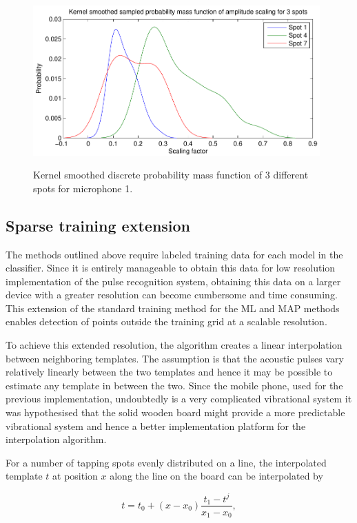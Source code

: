 \begin{figure}
\centering
  \includegraphics[width=110mm]{amplitudeProbMass.pdf}\\
  \caption{Kernel smoothed discrete probability mass function of 3 different spots for microphone 1.}\label{fig:amplitudeProbMass.pdf}
\end{figure}

\subsection{Sparse training extension}\label{sec:APRspareTraining}
The methods outlined above require labeled training data for each model in the classifier. Since it is entirely manageable to obtain this data for low resolution implementation of the pulse recognition system, obtaining this data on a larger device with a greater resolution can become cumbersome and time consuming. This extension of the standard training method for the ML and MAP methods enables detection of points outside the training grid at a scalable resolution.

To achieve this extended resolution, the algorithm creates a linear interpolation between neighboring templates. The assumption is that the acoustic pulses vary relatively linearly between the two templates and hence it may be possible to estimate any template in between the two. Since the mobile phone, used for the previous implementation, undoubtedly is a very complicated vibrational system it was hypothesised that the solid wooden board might provide a more predictable vibrational system and hence a better implementation platform for the interpolation algorithm.

For a number of tapping spots evenly distributed on a line, the interpolated template $t$ at position $x$ along the line on the board can be interpolated by

\begin{equation}\label{eq:interp}
t = t_0 + \left(x - x_0\right) \frac{t_{1} - t^j}{x_1 - x_0},
\end{equation}

